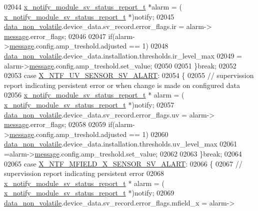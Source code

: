 \begin{DoxyCode}
{{{{{02044             \hyperlink{a00021_d7/d1b/a00864}{x\_notify\_module\_sv\_status\_report\_t} *alarm = (
      \hyperlink{a00021_d7/d1b/a00864}{x\_notify\_module\_sv\_status\_report\_t} *)notify;
02045             \hyperlink{a00060_a76ac5f917f5308dcd83de0d7c94559fb}{data\_non\_volatile}.device\_data.sv\_record.error\_flags.ir = alarm->
      \hyperlink{a00021_a13393a2d1589483b3bae4d2e79f43980}{message}.error\_flags;
02046 
02047             \textcolor{keywordflow}{if}(alarm->\hyperlink{a00021_a13393a2d1589483b3bae4d2e79f43980}{message}.config.amp\_treshold.adjusted == 1)
02048                 \hyperlink{a00060_a76ac5f917f5308dcd83de0d7c94559fb}{data\_non\_volatile}.device\_data.installation.thresholds.ir\_level\_max
02049                  = alarm->\hyperlink{a00021_a13393a2d1589483b3bae4d2e79f43980}{message}.config.amp\_treshold.set\_value;
02050 
02051         \}\textcolor{keywordflow}{break};
02052 
02053          \textcolor{keywordflow}{case}  \hyperlink{a00021_a146527c519502db561ac17015bf9df5b}{X\_NTF\_UV\_SENSOR\_SV\_ALART}:
02054         \{
02055             \textcolor{comment}{// supervission report indicating persistent error or when change is made on configured data}
02056             \hyperlink{a00021_d7/d1b/a00864}{x\_notify\_module\_sv\_status\_report\_t} * alarm = (
      \hyperlink{a00021_d7/d1b/a00864}{x\_notify\_module\_sv\_status\_report\_t} *)notify;
02057             \hyperlink{a00060_a76ac5f917f5308dcd83de0d7c94559fb}{data\_non\_volatile}.device\_data.sv\_record.error\_flags.uv = alarm->
      \hyperlink{a00021_a13393a2d1589483b3bae4d2e79f43980}{message}.error\_flags;
02058 
02059              \textcolor{keywordflow}{if}(alarm->\hyperlink{a00021_a13393a2d1589483b3bae4d2e79f43980}{message}.config.amp\_treshold.adjusted == 1)
02060                 \hyperlink{a00060_a76ac5f917f5308dcd83de0d7c94559fb}{data\_non\_volatile}.device\_data.installation.thresholds.uv\_level\_max
02061                  =alarm->\hyperlink{a00021_a13393a2d1589483b3bae4d2e79f43980}{message}.config.amp\_treshold.set\_value;
02062 
02063         \}\textcolor{keywordflow}{break};
02064 
02065         \textcolor{keywordflow}{case}  \hyperlink{a00021_a9d9558fb2155bafac3683d00b2a18b3f}{X\_NTF\_MFIELD\_X\_SENSOR\_SV\_ALART}:
02066         \{
02067             \textcolor{comment}{// supervission report indicating persistent error}
02068             \hyperlink{a00021_d7/d1b/a00864}{x\_notify\_module\_sv\_status\_report\_t} * alarm = (
      \hyperlink{a00021_d7/d1b/a00864}{x\_notify\_module\_sv\_status\_report\_t} *)notify;
02069             \hyperlink{a00060_a76ac5f917f5308dcd83de0d7c94559fb}{data\_non\_volatile}.device\_data.sv\_record.error\_flags.mfield\_x = alarm->
}}}}}
\end{DoxyCode}
